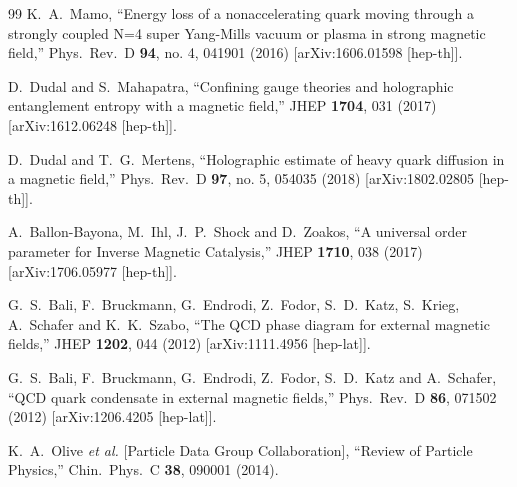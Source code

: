 \documentclass[11pt,a4paper,psfrag]{article}
\begin{document}
\begin{thebibliography}{99}
  K.~A.~Mamo,
  ``Energy loss of a nonaccelerating quark moving through a strongly coupled N=4 super Yang-Mills vacuum or plasma in strong magnetic field,''
  Phys.\ Rev.\ D {\bf 94}, no. 4, 041901 (2016)
  [arXiv:1606.01598 [hep-th]].

  D.~Dudal and S.~Mahapatra,
  ``Confining gauge theories and holographic entanglement entropy with a magnetic field,''
  JHEP {\bf 1704}, 031 (2017)
  [arXiv:1612.06248 [hep-th]].

  D.~Dudal and T.~G.~Mertens,
  ``Holographic estimate of heavy quark diffusion in a magnetic field,''
  Phys.\ Rev.\ D {\bf 97}, no. 5, 054035 (2018)
  [arXiv:1802.02805 [hep-th]].

  A.~Ballon-Bayona, M.~Ihl, J.~P.~Shock and D.~Zoakos,
  ``A universal order parameter for Inverse Magnetic Catalysis,''
  JHEP {\bf 1710}, 038 (2017)
  [arXiv:1706.05977 [hep-th]].

  G.~S.~Bali, F.~Bruckmann, G.~Endrodi, Z.~Fodor, S.~D.~Katz, S.~Krieg, A.~Schafer and K.~K.~Szabo,
  ``The QCD phase diagram for external magnetic fields,''
  JHEP {\bf 1202}, 044 (2012)
  [arXiv:1111.4956 [hep-lat]].

  G.~S.~Bali, F.~Bruckmann, G.~Endrodi, Z.~Fodor, S.~D.~Katz and A.~Schafer,
  ``QCD quark condensate in external magnetic fields,''
  Phys.\ Rev.\ D {\bf 86}, 071502 (2012)
  [arXiv:1206.4205 [hep-lat]].


  K.~A.~Olive {\it et al.}  [Particle Data Group Collaboration],
  ``Review of Particle Physics,''
  Chin.\ Phys.\ C {\bf 38}, 090001 (2014).


\end{thebibliography}
\end{document}
